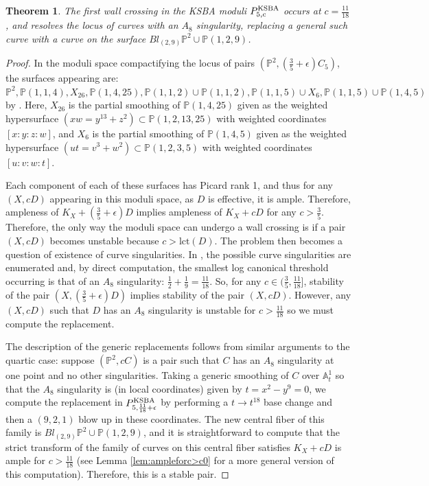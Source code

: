 \documentclass[11pt]{amsart}
\numberwithin{equation}{section}
\newtheorem{theorem}{Theorem}[section]
\theoremstyle{definition}
\newcommand{\KSBA}{{\rm KSBA}}
\newcommand{\bP}{\mathbb{P}}
\newcommand{\bA}{\mathbb{A}}
\newcommand{\lct}{\mathrm{lct}}
\begin{document}
\begin{theorem}
    The first wall crossing in the KSBA moduli $P_{5,c}^{\KSBA}$ occurs at $c = \frac{11}{18}$, and resolves the locus of curves with an $A_8$ singularity, replacing a general such curve with a curve on the surface $Bl_{(2,9)} \bP^2 \cup \bP(1,2,9)$.
\end{theorem}

\begin{proof}
    In the moduli space compactifying the locus of pairs $(\bP^2, (\frac{3}{5} + \epsilon)C_5)$, the surfaces appearing are: $\bP^2, \bP(1,1,4), X_{26}, \bP(1,4,25), \bP(1,1,2) \cup \bP(1,1,2), \bP(1,1,5) \cup X_6, \bP(1,1,5) \cup \bP(1,4,5)$ by \cite[Section 11.2]{hacking}. Here, $X_{26}$ is the partial smoothing of $\bP(1,4,25)$ given as the weighted hypersurface $ (xw = y^{13} + z^2) \subset \bP(1,2,13,25)$ with weighted coordinates $[x:y:z:w]$, and $X_6$ is the partial smoothing of $\bP(1,4,5)$ given as the weighted hypersurface $ (ut = v^3 + w^2) \subset \bP(1,2,3,5)$ with weighted coordinates $[u:v:w:t]$.
    
    Each component of each of these surfaces has Picard rank 1, and thus for any $(X,c D)$ appearing in this moduli space, as $D$ is effective, it is ample.  Therefore, ampleness of $K_X + (\frac{3}{5} + \epsilon) D$ implies ampleness of $K_X +cD$ for any $c > \frac{3}{5}$.  Therefore, the only way the moduli space can undergo a wall crossing is if a pair $(X, cD)$ becomes unstable because $c > \lct ( D)$.  The problem then becomes a question of existence of curve singularities.  In \cite[Section 11.2]{hacking}, the possible curve singularities are enumerated and, by direct computation, the smallest log canonical threshold occurring is that of an $A_8$ singularity: $\frac{1}{2} + \frac{1}{9} = \frac{11}{18}$. So, for any $c \in (\frac{3}{5},\frac{11}{18}]$, stability of the pair $(X, (\frac{3}{5}+ \epsilon)D)$ implies stability of the pair $(X,c D)$.  However, any $(X,cD)$ such that $D$ has an $A_8$ singularity is unstable for $c> \frac{11}{18}$ so we must compute the replacement. 

    The description of the generic replacements follows from similar arguments to the quartic case: suppose $(\bP^2, cC)$ is a pair such that $C$ has an $A_8$ singularity at one point and no other singularities.  Taking a generic smoothing of $C$ over $\bA^1_t$ so that the $A_8$ singularity is (in local coordinates) given by $t = x^2 - y^9 = 0$, we compute the replacement in $P^{\KSBA}_{5,\frac{11}{18}+\epsilon}$ by performing a $t \to t^{18}$ base change and then a $(9,2,1)$ blow up in these coordinates.  The new central fiber of this family is $Bl_{(2,9)} \bP^2 \cup \bP(1,2,9)$, and it is straightforward to compute that the strict transform of the family of curves on this central fiber satisfies $K_X + cD$ is ample for $c > \frac{11}{18}$ (see Lemma \ref{lem:ampleforc>c0} for a more general version of this computation).  Therefore, this is a stable pair. 
\end{proof}
\end{document}

